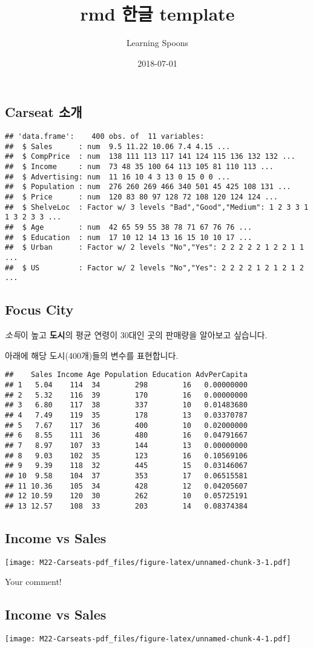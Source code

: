 \documentclass[a4paper]{article}
\title{rmd 한글 template}
\author{Learning Spoons}
\date{2018-07-01}
\begin{document}
\maketitle

\subsection{Carseat 소개}\label{carseat-}

\begin{verbatim}
## 'data.frame':    400 obs. of  11 variables:
##  $ Sales      : num  9.5 11.22 10.06 7.4 4.15 ...
##  $ CompPrice  : num  138 111 113 117 141 124 115 136 132 132 ...
##  $ Income     : num  73 48 35 100 64 113 105 81 110 113 ...
##  $ Advertising: num  11 16 10 4 3 13 0 15 0 0 ...
##  $ Population : num  276 260 269 466 340 501 45 425 108 131 ...
##  $ Price      : num  120 83 80 97 128 72 108 120 124 124 ...
##  $ ShelveLoc  : Factor w/ 3 levels "Bad","Good","Medium": 1 2 3 3 1 1 3 2 3 3 ...
##  $ Age        : num  42 65 59 55 38 78 71 67 76 76 ...
##  $ Education  : num  17 10 12 14 13 16 15 10 10 17 ...
##  $ Urban      : Factor w/ 2 levels "No","Yes": 2 2 2 2 2 1 2 2 1 1 ...
##  $ US         : Factor w/ 2 levels "No","Yes": 2 2 2 2 1 2 1 2 1 2 ...
\end{verbatim}

\subsection{Focus City}\label{focus-city}

\emph{소득}이 높고 \textbf{도시}의 평균 연령이 30대인 곳의 판매량을
알아보고 싶습니다.

아래에 해당 도시(400개)들의 변수를 표현합니다.

\begin{verbatim}
##    Sales Income Age Population Education AdvPerCapita
## 1   5.04    114  34        298        16   0.00000000
## 2   5.32    116  39        170        16   0.00000000
## 3   6.80    117  38        337        10   0.01483680
## 4   7.49    119  35        178        13   0.03370787
## 5   7.67    117  36        400        10   0.02000000
## 6   8.55    111  36        480        16   0.04791667
## 7   8.97    107  33        144        13   0.00000000
## 8   9.03    102  35        123        16   0.10569106
## 9   9.39    118  32        445        15   0.03146067
## 10  9.58    104  37        353        17   0.06515581
## 11 10.36    105  34        428        12   0.04205607
## 12 10.59    120  30        262        10   0.05725191
## 13 12.57    108  33        203        14   0.08374384
\end{verbatim}

\subsection{Income vs Sales}\label{income-vs-sales}

\texttt{[image: M22-Carseats-pdf\_files/figure-latex/unnamed-chunk-3-1.pdf]}

Your comment!

\subsection{Income vs Sales}\label{income-vs-sales-1}

\texttt{[image: M22-Carseats-pdf\_files/figure-latex/unnamed-chunk-4-1.pdf]}
\end{document}
